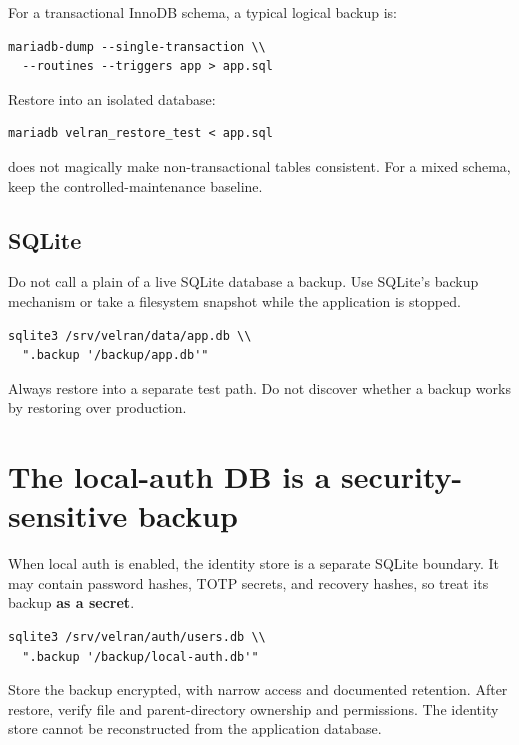 For a transactional InnoDB schema, a typical logical backup is:

\begin{lstlisting}
mariadb-dump --single-transaction \\
  --routines --triggers app > app.sql
\end{lstlisting}

Restore into an isolated database:

\begin{lstlisting}
mariadb velran_restore_test < app.sql
\end{lstlisting}

 does not magically make non-transactional tables consistent. For a mixed schema, keep the controlled-maintenance baseline.

\subsection*{SQLite}

Do not call a plain  of a live SQLite database a backup. Use SQLite's backup mechanism or take a filesystem snapshot while the application is stopped.

\begin{lstlisting}
sqlite3 /srv/velran/data/app.db \\
  ".backup '/backup/app.db'"
\end{lstlisting}

Always restore into a separate test path. Do not discover whether a backup works by restoring over production.

\section{The local-auth DB is a security-sensitive backup}

When local auth is enabled, the identity store is a separate SQLite boundary. It may contain password hashes, TOTP secrets, and recovery hashes, so treat its backup \textbf{as a secret}.

\begin{lstlisting}
sqlite3 /srv/velran/auth/users.db \\
  ".backup '/backup/local-auth.db'"
\end{lstlisting}

Store the backup encrypted, with narrow access and documented retention. After restore, verify file and parent-directory ownership and permissions. The identity store cannot be reconstructed from the application database.

